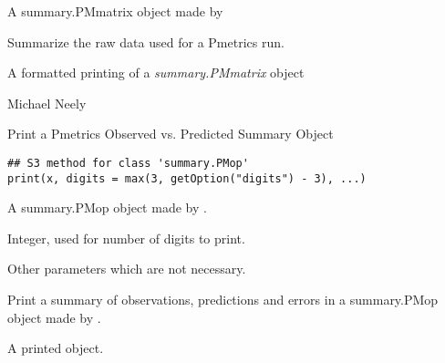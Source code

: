 \documentclass[a4paper]{book}
\begin{document}
%
\begin{Arguments}
\begin{ldescription}
\item[\code{x}] A summary.PMmatrix object made by 
\end{ldescription}
\end{Arguments}
%
\begin{Details}\relax
Summarize the raw data used for a Pmetrics run.
\end{Details}
%
\begin{Value}
A formatted printing of a \emph{summary.PMmatrix} object
\end{Value}
%
\begin{Author}\relax
Michael Neely
\end{Author}
%
\begin{SeeAlso}\relax
{}
\end{SeeAlso}
%
\begin{Description}\relax
Print a Pmetrics Observed vs. Predicted Summary Object
\end{Description}
%
\begin{Usage}
\begin{verbatim}
## S3 method for class 'summary.PMop'
print(x, digits = max(3, getOption("digits") - 3), ...)
\end{verbatim}
\end{Usage}
%
\begin{Arguments}
\begin{ldescription}
\item[\code{x}] A summary.PMop object made by .

\item[\code{digits}] Integer, used for number of digits to print.

\item[\code{...}] Other parameters which are not necessary.
\end{ldescription}
\end{Arguments}
%
\begin{Details}\relax
Print a summary of observations, predictions and errors in a summary.PMop object made by .
\end{Details}
%
\begin{Value}
A printed object.
\end{Value}
\end{document}
